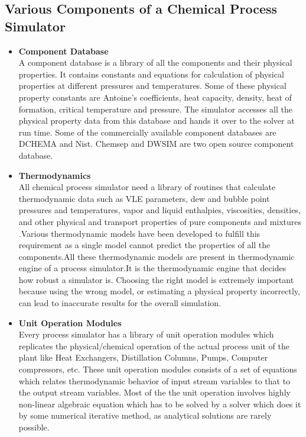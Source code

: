 \documentclass[12pt]{report}
\begin{document}
\subsection{Various Components of a Chemical Process Simulator}
\begin{itemize}
\item{\textbf{Component Database}} \\
A component database is a library of all the components and their physical properties. It contains constants and equations for calculation of physical properties at different pressures and temperatures. Some of these physical property constants are Antoine's coefficients, heat capacity, density, heat of formation, critical temperature and pressure. The simulator accesses all the physical property data from this database and hands it over to the solver at run time. Some of the commercially available component databases are DCHEMA and Nist. Chemsep and DWSIM are two open source component database.

\item{\textbf{Thermodynamics}} \\
All chemical process simulator need a library of routines that calculate thermodynamic data such as VLE parameters, dew and bubble point pressures and temperatures, vapor and liquid enthalpies, viscosities, densities, and other physical and transport properties of pure components and mixtures .Various thermodynamic models have been developed to fulfill this requirement as a single model cannot predict the properties of all the components.All these thermodynamic models are present in thermodynamic engine of a process simulator.It is the thermodynamic engine that decides how robust a simulator is. Choosing the right model is extremely important because using the wrong model, or estimating a physical property incorrectly, can lead to inaccurate results for the overall simulation.

\item{\textbf{Unit Operation Modules}} \\
Every process simulator has a library of unit operation modules which replicates the physical/chemical operation of the actual process unit of the plant like Heat Exchangers, Distillation Columns, Pumps, Computer compressors, etc. These unit operation modules consists of a set of equations which relates thermodynamic behavior of input stream variables to that to the output stream variables. Most of the the unit operation involves highly non-linear algebraic equation which has to be solved by
a solver which does it by some numerical iterative method, as analytical solutions are rarely possible.


\end{itemize}
\end{document}
